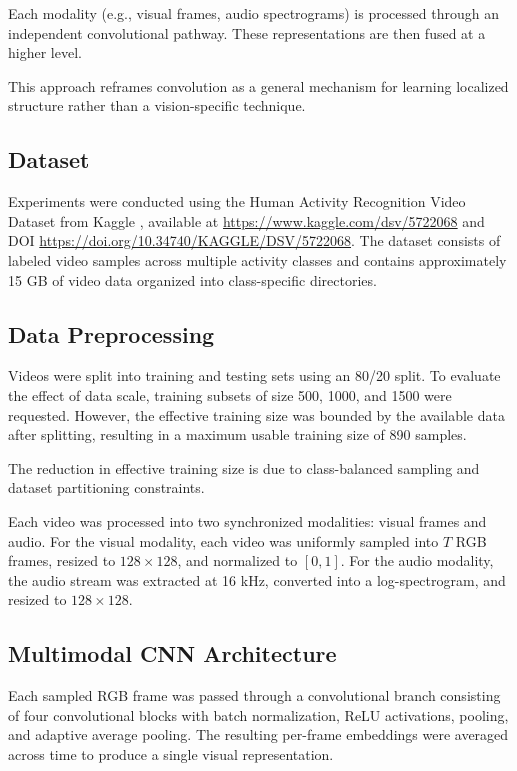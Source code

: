 \documentclass[lineno]{wlpeerj}
\begin{document}
	Each modality (e.g., visual frames, audio spectrograms) is processed through an independent convolutional pathway. These representations are then fused at a higher level.
	
	This approach reframes convolution as a general mechanism for learning localized structure rather than a vision-specific technique.
	\subsection{Dataset}
	
	Experiments were conducted using the Human Activity Recognition Video Dataset from Kaggle \cite{dataset}, available at \url{https://www.kaggle.com/dsv/5722068} and DOI \url{https://doi.org/10.34740/KAGGLE/DSV/5722068}. The dataset consists of labeled video samples across multiple activity classes and contains approximately 15 GB of video data organized into class-specific directories.
	
	
\subsection{Data Preprocessing}

Videos were split into training and testing sets using an 80/20 split. To evaluate the effect of data scale, training subsets of size 500, 1000, and 1500 were requested. However, the effective training size was bounded by the available data after splitting, resulting in a maximum usable training size of 890 samples.

The reduction in effective training size is due to class-balanced sampling and dataset partitioning constraints.

Each video was processed into two synchronized modalities: visual frames and audio. For the visual modality, each video was uniformly sampled into $T$ RGB frames, resized to $128 \times 128$, and normalized to $[0,1]$. For the audio modality, the audio stream was extracted at 16 kHz, converted into a log-spectrogram, and resized to $128 \times 128$.

\subsection{Multimodal CNN Architecture}

Each sampled RGB frame was passed through a convolutional branch consisting of four convolutional blocks with batch normalization, ReLU activations, pooling, and adaptive average pooling. The resulting per-frame embeddings were averaged across time to produce a single visual representation.
\end{document}
